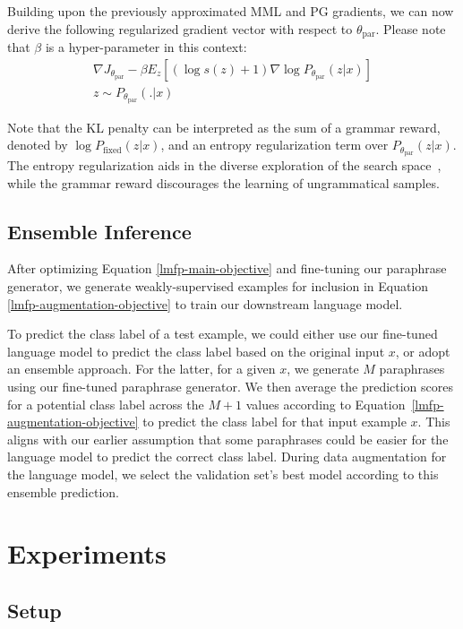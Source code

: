 \documentclass[11pt]{article}
\begin{document}
Building upon the previously approximated MML and PG gradients, we can now derive the following regularized gradient vector with respect to $\theta_{\text{par}}$. Please note that $\beta$ is a hyper-parameter in this context:
\begin{multline}
\nabla J_{\theta_{\text{par}}} - \beta E_{z} [(\log s(z) + 1) \nabla \log P_{\theta_{\text{par}}} (z | x)] \\
z \sim P_{\theta_{\text{par}}}(.|x)
\label{lmfp-expect-ppo-gradient}
\end{multline}

Note that the KL penalty can be interpreted as the sum of a grammar reward, denoted by $\log P_{\text{fixed}}(z|x)$, and an entropy regularization term over $P_{\theta_{\text{par}}} (z | x)$. The entropy regularization aids in the diverse exploration of the search space~\cite{DBLP:journals/corr/MnihBMGLHSK16}, while the grammar reward discourages the learning of ungrammatical samples.


\subsection{Ensemble Inference}
\label{ensemble-inference}
After optimizing Equation \ref{lmfp-main-objective} and fine-tuning our paraphrase generator, we generate weakly-supervised examples for inclusion in Equation \ref{lmfp-augmentation-objective} to train our downstream language model.

To predict the class label of a test example, we could either use our fine-tuned language model to predict the class label based on the original input $x$, or adopt an ensemble approach. For the latter, for a given $x$, we generate $M$ paraphrases using our fine-tuned paraphrase generator. We then average the prediction scores for a potential class label across the $M+1$ values according to Equation~\ref{lmfp-augmentation-objective} to predict the class label for that input example $x$. This aligns with our earlier assumption that some paraphrases could be easier for the language model to predict the correct class label. During data augmentation for the language model, we select the validation set's best model according to this ensemble prediction.

\section{Experiments}

\subsection{Setup}
\end{document}
